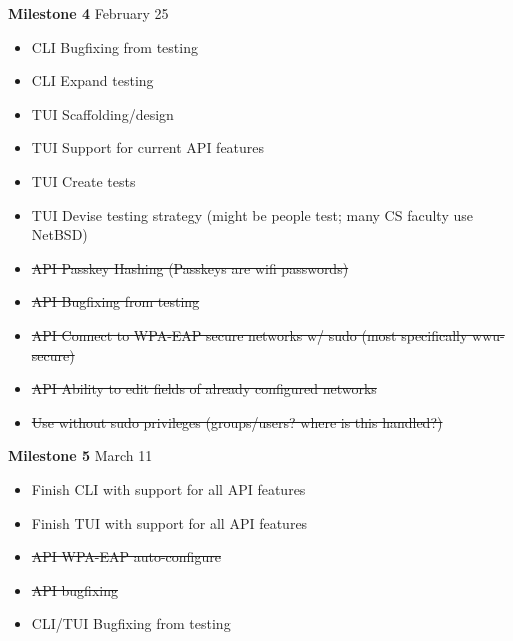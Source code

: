 \documentclass[11pt]{article}
\begin{document}
\textbf{Milestone 4} February 25
\begin{itemize}
  \item CLI Bugfixing from testing
  \item CLI Expand testing
  \item TUI Scaffolding/design
  \item TUI Support for current API features
  \item TUI Create tests
  \item TUI Devise testing strategy (might be people test; many CS faculty use NetBSD)
  \item\sout{API Passkey Hashing (Passkeys are wifi passwords)}
  \item\sout{API Bugfixing from testing}
  \item\sout{API Connect to WPA-EAP secure networks w/ sudo (most specifically wwu-secure)}
  \item\sout{API Ability to edit fields of already configured networks}
  \item\sout{Use without sudo privileges (groups/users? where is this handled?)}
\end{itemize}

\textbf{Milestone 5} March 11
\begin{itemize}
  \item Finish CLI with support for all API features
  \item Finish TUI with support for all API features
  \item\sout{API WPA-EAP auto-configure}
  \item\sout{API bugfixing}
  \item CLI/TUI Bugfixing from testing
\end{itemize}
\end{document}
